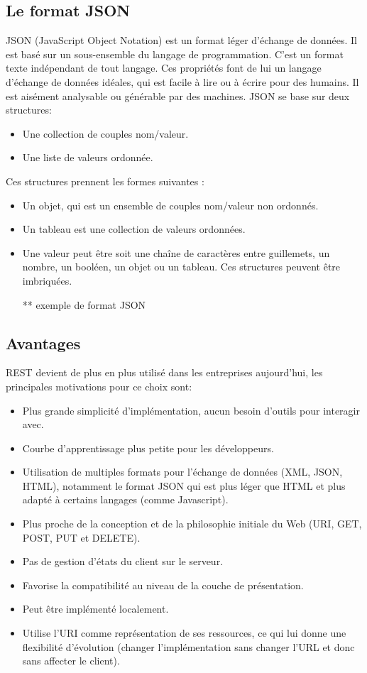 \subsection{Le format JSON}
JSON (JavaScript Object Notation) est un format léger d'échange de données. Il est basé sur un sous-ensemble du langage de programmation. C’est un format texte indépendant de tout langage.
Ces propriétés font de lui un langage d'échange de données idéales, qui est facile à lire ou à écrire pour des humains. Il est aisément analysable ou générable par des machines. 
JSON se base sur deux structures:
\begin{itemize}
	
	\item Une collection de couples nom/valeur. 
	\item Une liste de valeurs ordonnée. 
\end{itemize}
Ces structures prennent les formes suivantes :
\begin{itemize}
	\item Un objet, qui est un ensemble de couples nom/valeur non ordonnés. 
	\item Un tableau est une collection de valeurs ordonnées. 
	\item Une valeur peut être soit une chaîne de caractères entre guillemets, un nombre, un booléen, un objet ou un tableau. Ces structures peuvent être imbriquées.
	      
	      ** exemple de format JSON
\end{itemize}

\subsection{Avantages}
REST devient de plus en plus utilisé dans les entreprises aujourd'hui, les principales motivations pour ce choix sont:\cite{refSOAPvsREST}
\begin{itemize}
	\item Plus grande simplicité d'implémentation, aucun besoin d'outils pour interagir avec.
	\item Courbe d'apprentissage plus petite pour les développeurs.
	\item Utilisation de multiples formats pour l'échange de données (XML, JSON, HTML), notamment le format JSON qui est plus léger que HTML et plus adapté à certains langages (comme Javascript).
	\item Plus proche de la conception et de la philosophie initiale du Web (URI, GET, POST, PUT et DELETE).
	\item Pas de gestion d'états du client sur le serveur.
	\item Favorise la compatibilité au niveau de la couche de présentation.
	\item Peut être implémenté localement.
	\item Utilise l'URI comme représentation de ses ressources, ce qui lui donne une flexibilité d'évolution (changer l'implémentation sans changer l'URL et donc sans affecter le client).
\end{itemize}
